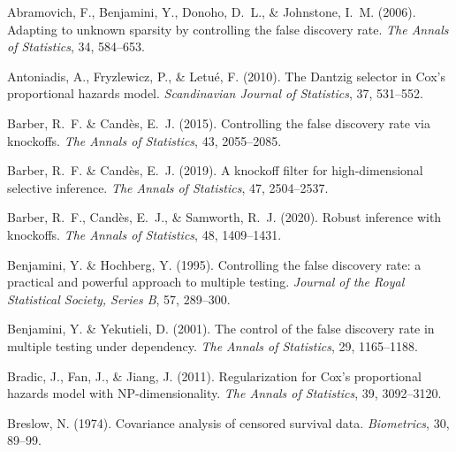 \documentclass[11pt]{article}
\begin{document}
\begin{thebibliography}{}
	Abramovich, F., Benjamini, Y., Donoho, D.~L., \& Johnstone, I.~M. (2006).
	\newblock Adapting to unknown sparsity by controlling the false discovery rate.
	\newblock \textit{The Annals of Statistics}, 34, 584--653.
	
	Antoniadis, A., Fryzlewicz, P., \& Letu{\'e}, F. (2010).
	\newblock The {Dantzig} selector in {Cox's} proportional hazards model.
	\newblock \textit{Scandinavian Journal of Statistics}, 37, 531--552.
	
	Barber, R.~F. \& Cand{\`e}s, E.~J. (2015).
	\newblock Controlling the false discovery rate via knockoffs.
	\newblock \textit{The Annals of Statistics}, 43, 2055--2085.
	
	Barber, R.~F. \& Cand{\`e}s, E.~J. (2019).
	\newblock A knockoff filter for high-dimensional selective inference.
	\newblock \textit{The Annals of Statistics}, 47, 2504--2537.
	
	Barber, R.~F., Cand{\`e}s, E.~J., \& Samworth, R.~J. (2020).
	\newblock Robust inference with knockoffs.
	\newblock \textit{The Annals of Statistics}, 48, 1409--1431.
	
	Benjamini, Y. \& Hochberg, Y. (1995).
	\newblock Controlling the false discovery rate: a practical and powerful
	approach to multiple testing.
	\newblock \textit{Journal of the Royal Statistical Society, Series B},
	57, 289--300.
	
	Benjamini, Y. \& Yekutieli, D. (2001).
	\newblock The control of the false discovery rate in multiple testing under
	dependency.
	\newblock \textit{The Annals of Statistics}, 29, 1165--1188.
	
	Bradic, J., Fan, J., \& Jiang, J. (2011).
	\newblock Regularization for {Cox’s} proportional hazards model with
	{NP}-dimensionality.
	\newblock \textit{The Annals of Statistics}, 39, 3092--3120.
	
	Breslow, N. (1974).
	\newblock Covariance analysis of censored survival data.
	\newblock \textit{Biometrics}, 30, 89--99.
	

\end{thebibliography}
\end{document}
